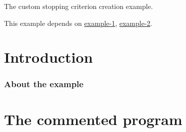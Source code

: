 The custom stopping criterion creation example.

This example depends on \hyperlink{example_1}{example-\/1}, \hyperlink{example_2}{example-\/2}.

 \label{_Intro}%
 \label{_Introduction}%
\section*{Introduction}

\label{_Abouttheexample}%
\subsubsection*{About the example }

\label{_CommProg}%
 \section*{The commented program}


